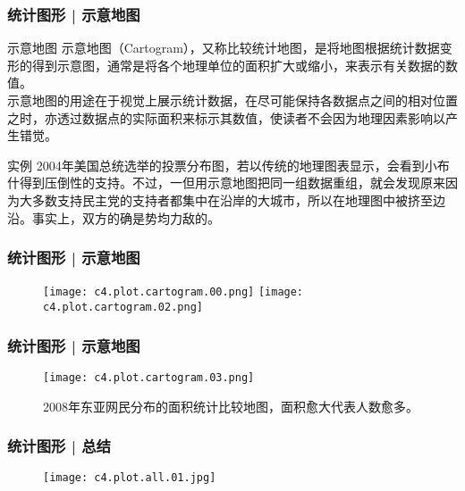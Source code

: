 \begin{frame}
  \frametitle{统计图形 | 示意地图}
  \begin{block}{示意地图}
示意地图（Cartogram），又称比较统计地图，是将地图根据统计数据变形的得到示意图，通常是将各个地理单位的面积扩大或缩小，来表示有关数据的数值。\\
\vspace{0.5em}
示意地图的用途在于视觉上展示统计数据，在尽可能保持各数据点之间的相对位置之时，亦透过数据点的实际面积来标示其数值，使读者不会因为地理因素影响以产生错觉。
  \end{block}
  \pause
  \begin{block}{实例}
2004年美国总统选举的投票分布图，若以传统的地理图表显示，会看到小布什得到压倒性的支持。不过，一但用示意地图把同一组数据重组，就会发现原来因为大多数支持民主党的支持者都集中在沿岸的大城市，所以在地理图中被挤至边沿。事实上，双方的确是势均力敌的。
  \end{block}
\end{frame}

\begin{frame}
  \frametitle{统计图形 | 示意地图}
  \begin{figure}
    \centering
    \texttt{[image: c4.plot.cartogram.00.png]}
    \texttt{[image: c4.plot.cartogram.02.png]}
  \end{figure}
\end{frame}

\begin{frame}
  \frametitle{统计图形 | 示意地图}
  \begin{figure}
    \centering
    \texttt{[image: c4.plot.cartogram.03.png]}
    \caption{2008年东亚网民分布的面积统计比较地图，面积愈大代表人数愈多。}
  \end{figure}
\end{frame}

\begin{frame}
  \frametitle{统计图形 | 总结}
  \begin{figure}
    \centering
    \texttt{[image: c4.plot.all.01.jpg]}
  \end{figure}
\end{frame}

